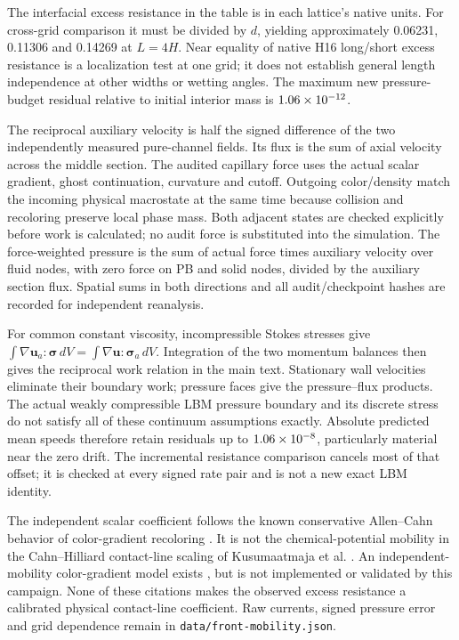 

The interfacial excess resistance in the table is in each lattice's native
units. For cross-grid comparison it must be divided by $d$, yielding
approximately 0.06231, 0.11306 and 0.14269 at $L=4H$.
Near equality of native H16 long/short excess resistance is a localization
test at one grid; it does not establish general length independence at
other widths or wetting angles. The maximum new pressure-budget residual
relative to initial interior mass is $1.06\times10^{-12}$.

The reciprocal auxiliary velocity is half the signed difference of the
two independently measured pure-channel fields. Its flux is the sum of
axial velocity across the middle section. The audited capillary force uses
the actual scalar gradient, ghost continuation, curvature and cutoff.
Outgoing color/density match the incoming physical macrostate at the same
time because collision and recoloring preserve local phase mass.
Both adjacent states are checked explicitly before work is calculated;
no audit force is substituted into the simulation.
The force-weighted pressure is the sum of actual force times auxiliary
velocity over fluid nodes, with zero force on PB and solid nodes, divided
by the auxiliary section flux. Spatial sums in both directions and all
audit/checkpoint hashes are recorded for independent reanalysis.

For common constant viscosity, incompressible Stokes stresses give
$\int\nabla\bm u_a:\bm\sigma\,dV=
\int\nabla\bm u:\bm\sigma_a\,dV$.
Integration of the two momentum balances then gives the reciprocal work
relation in the main text. Stationary wall velocities eliminate their
boundary work; pressure faces give the pressure--flux products.
The actual weakly compressible LBM pressure boundary and its discrete
stress do not satisfy all of these continuum assumptions exactly.
Absolute predicted mean speeds therefore retain residuals up to
$1.06\times10^{-8}$, particularly material near the zero drift.
The incremental resistance comparison cancels most of that offset; it
is checked at every signed rate pair and is not a new exact LBM identity.

The independent scalar coefficient follows the known conservative
Allen--Cahn behavior of color-gradient recoloring \cite{subhedar2020}.
It is not the chemical-potential mobility in the Cahn--Hilliard
contact-line scaling of Kusumaatmaja et al. \cite{kusumaatmaja2016}.
An independent-mobility color-gradient model exists \cite{subhedar2022},
but is not implemented or validated by this campaign. None of these
citations makes the observed excess resistance a calibrated physical
contact-line coefficient. Raw currents, signed pressure error and
grid dependence remain in \texttt{data/front-mobility.json}.
